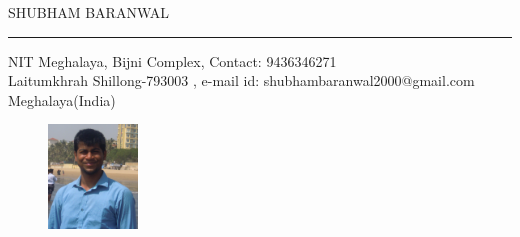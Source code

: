 \documentclass{article}
\begin{document}
 \begin{center}
 	 {
 	 	\large { SHUBHAM BARANWAL}
 	 }
 	
 \end{center}
 \hrule
 \begin{flushleft}
 	NIT Meghalaya, Bijni Complex, 		\hspace{1.7in}    		    Contact: 9436346271            \\
 	Laitumkhrah Shillong-793003  , 		\hspace{1.8in}		   e-mail id: shubhambaranwal2000@gmail.com\\
 	Meghalaya(India)     \\
\end{flushleft}

\vspace{-0.3in}

\begin{figure}[h]
	\hspace{4.4in}
	\includegraphics[width=90px]{shubham}
\end{figure}
\end{document}
